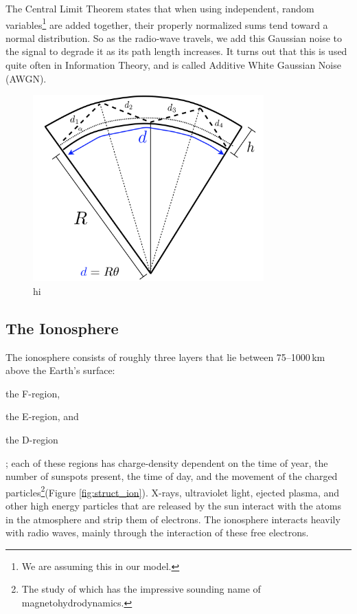 \documentclass[11pt]{article}
\numberwithin{equation}{section}
\begin{document}
The Central Limit Theorem states that when using independent, random variables\footnote{We are assuming this in our model.} are added together, their properly normalized sums tend toward a normal distribution.\cite{central} So as the radio-wave travels, we add this Gaussian noise to the signal to degrade it as its path length increases. It turns out that this is used quite often in Information Theory, and is called Additive White Gaussian Noise (AWGN).\cite{shannon1984communication,kailath1968innovations}

\begin{figure}[ht]
 \begin{center}
     \includegraphics[width = 3.5in]{figs/radio_curve.png}
 \end{center}
 \caption{hi}
 \label{fig:radio_curve}
\end{figure}


\subsection{The Ionosphere} %
\label{sub:the_ionosphere}

The ionosphere consists of roughly three layers that lie between 75--1000\,km above the Earth's surface:
\begin{enumerate*}[(1)]
    \item the F-region,
    \item the E-region, and
    \item the D-region
\end{enumerate*}; each of these regions has charge-density dependent on the time of year, the number of sunspots present, the time of day, and the movement of the charged particles\footnote{The study of which has the impressive sounding name of magnetohydrodynamics.}(Figure \ref{fig:struct_ion}). X-rays, ultraviolet light, ejected plasma, and other high energy particles that are released by the sun interact with the atoms in the atmosphere and strip them of electrons.\cite{noauthor_tracking_nodate} The ionosphere interacts heavily with radio waves, mainly through the interaction of these free electrons.\cite{budden1961radio}
\end{document}
